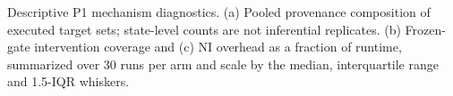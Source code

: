 \caption{Descriptive P1 mechanism diagnostics. (a) Pooled provenance composition of executed target sets; state-level counts are not inferential replicates. (b) Frozen-gate intervention coverage and (c) NI overhead as a fraction of runtime, summarized over 30 runs per arm and scale by the median, interquartile range and 1.5-IQR whiskers.}
